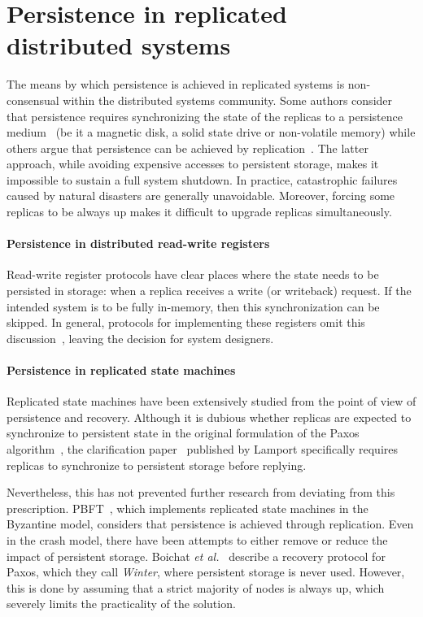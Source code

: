 \section{Persistence in replicated distributed systems}

The means by which persistence is achieved in replicated
systems is non-consensual within the distributed systems
community. Some authors consider that persistence requires
synchronizing the state of the replicas to a persistence
medium~\cite{gaios} (be it a magnetic disk, a solid state drive or non-volatile
memory) while others argue that persistence can be achieved by
replication~\cite{pbft,byz_fault_tolerant,hq,zyzzyva}. The latter approach, while avoiding expensive
accesses to persistent storage, makes it impossible to sustain a
full system shutdown. In practice, catastrophic failures
caused by natural disasters are generally unavoidable.
Moreover, forcing some replicas to be always up
makes it difficult to upgrade replicas simultaneously.

\paragraph{Persistence in distributed read-write registers}
Read-write register protocols have clear places where the state
needs to be persisted in storage: when a replica receives a write
(or writeback) request.  If the intended system is to be fully
in-memory, then this synchronization can be skipped. In general,
protocols for implementing these registers omit this
discussion~\cite{abd,time_efficient_abd}, leaving the decision
for system designers.

\paragraph{Persistence in replicated state machines}
Replicated state machines have been extensively studied from the
point of view of persistence and recovery. Although it is dubious
whether replicas are expected to synchronize to persistent state
in the original formulation of the Paxos algorithm~\cite{paxos},
the clarification paper~\cite{paxos-simple} published by Lamport
specifically requires replicas to synchronize to persistent
storage before replying.

Nevertheless, this has not prevented further research
from deviating from this prescription. PBFT~\cite{pbft}, which
implements replicated state machines in the Byzantine model,
considers that persistence is achieved through replication. Even
in the crash model, there have been attempts to either remove or
reduce the impact of persistent storage. Boichat \emph{et
al.}~\cite{winter} describe a recovery protocol for Paxos, which
they call \emph{Winter}, where persistent storage is never used.
However, this is done by assuming that a strict majority of nodes
is always up, which severely limits the practicality of the
solution.

